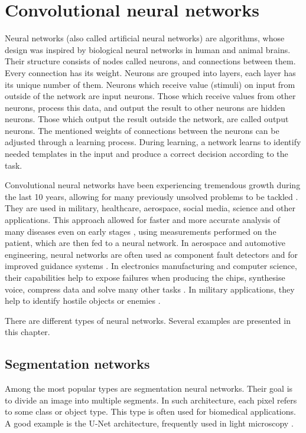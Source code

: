 \section{Convolutional neural networks}

Neural networks (also called artificial neural networks) are algorithms, whose design was inspired by biological neural networks in human and animal brains. Their structure consists of nodes called neurons, and connections between them. Every connection has its weight. Neurons are grouped into layers, each layer has its unique number of them. Neurons which receive value (stimuli) on input from outside of the network are input neurons. Those which receive values from other neurons, process this data, and output the result to other neurons are hidden neurons. Those which output the result outside the network, are called output neurons. The mentioned weights of connections between the neurons can be adjusted through a learning process. During learning, a network learns to identify needed templates in the input and produce a correct decision according to the task. 

Convolutional neural networks have been experiencing tremendous growth during the last 10 years, allowing for many previously unsolved problems to be tackled \cite{li2021survey}. They are used in military, healthcare, aerospace, social media, science and other applications. This approach allowed for faster and more accurate analysis of many diseases even on early stages \cite{zhou2018unet++}, using measurements performed on the patient, which are then fed to a neural network. In aerospace and automotive engineering, neural networks are often used as component fault detectors and for improved guidance systems \cite{yaqoob2019autonomous}. In electronics manufacturing and computer science, their capabilities help to expose failures when producing the chips, synthesise voice, compress data and solve many other tasks \cite{gomez2016neural, goyal2018deepzip}. In military applications, they help to identify hostile objects or enemies \cite{wu2015typical}. 


There are different types of neural networks. Several examples are presented in this chapter.

\subsection{Segmentation networks}
Among the most popular types are segmentation neural networks. Their goal is to divide an image into multiple segments. In such architecture, each pixel refers to some class or object type. This type is often used for biomedical applications. A good example is the U-Net architecture, frequently used in light microscopy \cite{ronneberger2015u}.

